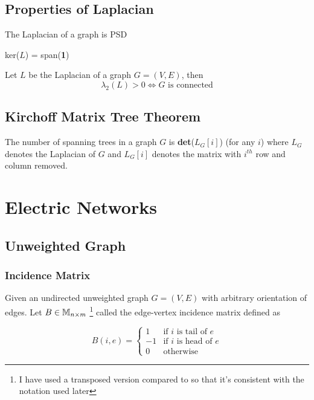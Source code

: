 \subsection{Properties of Laplacian}

\begin{Bf}
 The Laplacian of a graph is PSD
\end{Bf}

\begin{Bf}
 ker($L$) = span(\textbf{1})
\end{Bf}

\begin{Bf}
 Let $L$ be the Laplacian of a graph $G= (V,E)$, then
 $$ \lambda_2(L) > 0 \iff G \text{ is connected}$$
\end{Bf}


\subsection{Kirchoff Matrix Tree Theorem}

\begin{Bf}
 The number of spanning trees in a graph $G$ is \textbf{det}($L_G[i]$) (for any $i$) where $L_G$ denotes the Laplacian of $G$ and $L_G[i]$ denotes the matrix with $i^{th}$ row and column removed. 
\end{Bf}


\section{Electric Networks}

\subsection{Unweighted Graph}

\subsubsection{Incidence Matrix} 

Given an undirected unweighted graph $G=(V,E)$ with arbitrary orientation of edges. Let $B \in  \mathbb{M}_{n \times m}$ \footnote{I have used a transposed version compared to \citet{TCS-054} so that it's consistent with the notation used later} called the edge-vertex incidence matrix defined as 

\[
    B(i, e) = 
\begin{cases}
 1 & \text{if } i \text{ is tail of } e\\
 -1 & \text{if } i \text{ is head of } e \\
 0 & \text{otherwise}
\end{cases}
\]

